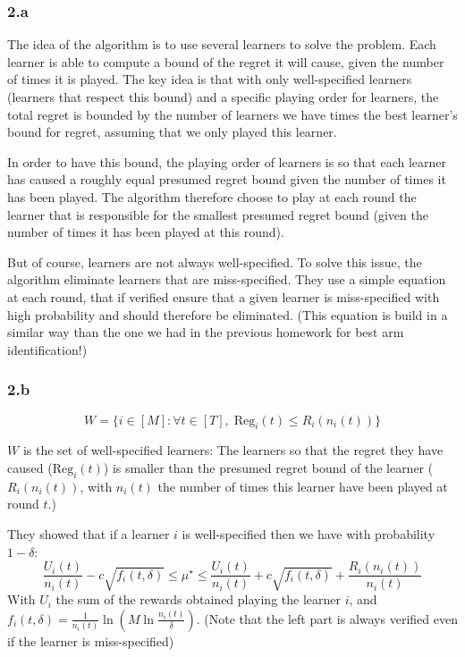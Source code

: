 \documentclass[a4paper]{article}
\begin{document}
\subsubsection*{2.a}
The idea of the algorithm is to use several learners to solve the problem. Each learner is able to compute a bound
of the regret it will cause, given the number of times it is played. The key idea is that with only well-specified learners (learners that
respect this bound) and a specific playing order for learners, the total regret is bounded by the number of learners we have times the best
learner's bound for regret, assuming that we only played this learner.

In order to have this bound, the playing order of learners is so that each learner has caused a roughly equal presumed regret bound given
the number of times it has been played. The algorithm therefore choose to play at each round the learner that is responsible
for the smallest presumed regret bound (given the number of times it has been played at this round).

But of course, learners are not always well-specified. To solve this issue, the algorithm eliminate learners that are miss-specified. They use a
simple equation at each round, that if verified ensure that a given learner is miss-specified with high probability and should therefore
be eliminated. (This equation is build in a similar way than the one we had in the previous homework for best arm identification!)

\subsubsection*{2.b}

\begin{equation*}
   W = \{i \in [M]: \forall t \in [T], \; \text{Reg}_i(t) \le R_i(n_i(t))\}
\end{equation*}

$W$ is the set of well-specified learners: The learners so that the regret they have caused ($\text{Reg}_i(t)$) is smaller than the presumed
regret bound of the learner ($R_i(n_i(t))$, with $n_i(t)$ the number of times this learner have been played at round $t$.)

They showed that if a learner $i$ is well-specified then we have with probability $1 - \delta$:
\begin{equation*}
   \frac{U_i(t)}{n_i(t)} - c\sqrt{f_i(t, \delta)} \le \mu^\star \le \frac{U_i(t)}{n_i(t)} + c\sqrt{f_i(t, \delta)} + \frac{R_i(n_i(t))}{n_i(t)}
\end{equation*}
With $U_i$ the sum of the rewards obtained playing the learner $i$, and $f_i(t, \delta) = \frac{1}{n_i(t)} \ln(M \ln\frac{n_i(t)}{\delta})$.
(Note that the left part is always verified even if the learner is miss-specified)
\end{document}
